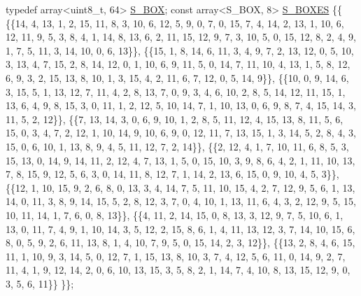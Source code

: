 \begin{DoxyCode}
\textcolor{keyword}{typedef} array<uint8\_t, 64> \hyperlink{namespacedes64_1_1__internal_a7c6e061269c399077858cb1504a53463}{S\_BOX};
\textcolor{keyword}{const} array<S\_BOX, 8> \hyperlink{namespacedes64_1_1__internal_ab6b95bc050b8e9ce0fe63190e204b022}{S\_BOXES}
\{\{
    \{\{14, 4, 13, 1, 2, 15, 11, 8, 3, 10, 6, 12, 5, 9, 0, 7, 0, 15, 7, 4, 14, 2, 13, 1, 10, 6, 12, 11, 9, 5,
       3, 8, 4, 1, 14, 8, 13, 6, 2, 11, 15, 12, 9, 7, 3, 10, 5, 0, 15, 12, 8, 2, 4, 9, 1, 7, 5, 11, 3, 14, 10, 0, 
      6, 13\}\},
    \{\{15, 1, 8, 14, 6, 11, 3, 4, 9, 7, 2, 13, 12, 0, 5, 10, 3, 13, 4, 7, 15, 2, 8, 14, 12, 0, 1, 10, 6, 9, 
      11, 5, 0, 14, 7, 11, 10, 4, 13, 1, 5, 8, 12, 6, 9, 3, 2, 15, 13, 8, 10, 1, 3, 15, 4, 2, 11, 6, 7, 12, 0, 5, 
      14, 9\}\},
    \{\{10, 0, 9, 14, 6, 3, 15, 5, 1, 13, 12, 7, 11, 4, 2, 8, 13, 7, 0, 9, 3, 4, 6, 10, 2, 8, 5, 14, 12, 11, 
      15, 1, 13, 6, 4, 9, 8, 15, 3, 0, 11, 1, 2, 12, 5, 10, 14, 7, 1, 10, 13, 0, 6, 9, 8, 7, 4, 15, 14, 3, 11, 5, 
      2, 12\}\},
    \{\{7, 13, 14, 3, 0, 6, 9, 10, 1, 2, 8, 5, 11, 12, 4, 15, 13, 8, 11, 5, 6, 15, 0, 3, 4, 7, 2, 12, 1, 10, 
      14, 9, 10, 6, 9, 0, 12, 11, 7, 13, 15, 1, 3, 14, 5, 2, 8, 4, 3, 15, 0, 6, 10, 1, 13, 8, 9, 4, 5, 11, 12, 7, 
      2, 14\}\},
    \{\{2, 12, 4, 1, 7, 10, 11, 6, 8, 5, 3, 15, 13, 0, 14, 9, 14, 11, 2, 12, 4, 7, 13, 1, 5, 0, 15, 10, 3, 9,
       8, 6, 4, 2, 1, 11, 10, 13, 7, 8, 15, 9, 12, 5, 6, 3, 0, 14, 11, 8, 12, 7, 1, 14, 2, 13, 6, 15, 0, 9, 10, 4,
       5, 3\}\},
    \{\{12, 1, 10, 15, 9, 2, 6, 8, 0, 13, 3, 4, 14, 7, 5, 11, 10, 15, 4, 2, 7, 12, 9, 5, 6, 1, 13, 14, 0, 11,
       3, 8, 9, 14, 15, 5, 2, 8, 12, 3, 7, 0, 4, 10, 1, 13, 11, 6, 4, 3, 2, 12, 9, 5, 15, 10, 11, 14, 1, 7, 6, 0, 
      8, 13\}\},
    \{\{4, 11, 2, 14, 15, 0, 8, 13, 3, 12, 9, 7, 5, 10, 6, 1, 13, 0, 11, 7, 4, 9, 1, 10, 14, 3, 5, 12, 2, 15,
       8, 6, 1, 4, 11, 13, 12, 3, 7, 14, 10, 15, 6, 8, 0, 5, 9, 2, 6, 11, 13, 8, 1, 4, 10, 7, 9, 5, 0, 15, 14, 2, 
      3, 12\}\},
    \{\{13, 2, 8, 4, 6, 15, 11, 1, 10, 9, 3, 14, 5, 0, 12, 7, 1, 15, 13, 8, 10, 3, 7, 4, 12, 5, 6, 11, 0, 14,
       9, 2, 7, 11, 4, 1, 9, 12, 14, 2, 0, 6, 10, 13, 15, 3, 5, 8, 2, 1, 14, 7, 4, 10, 8, 13, 15, 12, 9, 0, 3, 5, 
      6, 11\}\}
\}\};


\end{DoxyCode}
